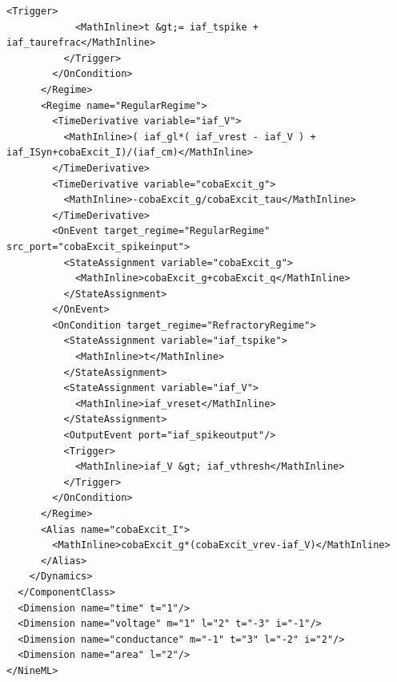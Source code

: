 \documentclass[draftspec]{ninemlspec}
\begin{document}
\begin{lstlisting}[label=code:xmliaf2]
          <Trigger>
            <MathInline>t &gt;= iaf_tspike + iaf_taurefrac</MathInline>
          </Trigger>
        </OnCondition>
      </Regime>
      <Regime name="RegularRegime">
        <TimeDerivative variable="iaf_V">
          <MathInline>( iaf_gl*( iaf_vrest - iaf_V ) + iaf_ISyn+cobaExcit_I)/(iaf_cm)</MathInline>
        </TimeDerivative>
        <TimeDerivative variable="cobaExcit_g">
          <MathInline>-cobaExcit_g/cobaExcit_tau</MathInline>
        </TimeDerivative>
        <OnEvent target_regime="RegularRegime" src_port="cobaExcit_spikeinput">
          <StateAssignment variable="cobaExcit_g">
            <MathInline>cobaExcit_g+cobaExcit_q</MathInline>
          </StateAssignment>
        </OnEvent>
        <OnCondition target_regime="RefractoryRegime">
          <StateAssignment variable="iaf_tspike">
            <MathInline>t</MathInline>
          </StateAssignment>
          <StateAssignment variable="iaf_V">
            <MathInline>iaf_vreset</MathInline>
          </StateAssignment>
          <OutputEvent port="iaf_spikeoutput"/>
          <Trigger>
            <MathInline>iaf_V &gt; iaf_vthresh</MathInline>
          </Trigger>
        </OnCondition>
      </Regime>
      <Alias name="cobaExcit_I">
        <MathInline>cobaExcit_g*(cobaExcit_vrev-iaf_V)</MathInline>
      </Alias>
    </Dynamics>
  </ComponentClass>
  <Dimension name="time" t="1"/>
  <Dimension name="voltage" m="1" l="2" t="-3" i="-1"/>
  <Dimension name="conductance" m="-1" t="3" l="-2" i="2"/>
  <Dimension name="area" l="2"/>
</NineML>
\end{lstlisting}
\end{document}
